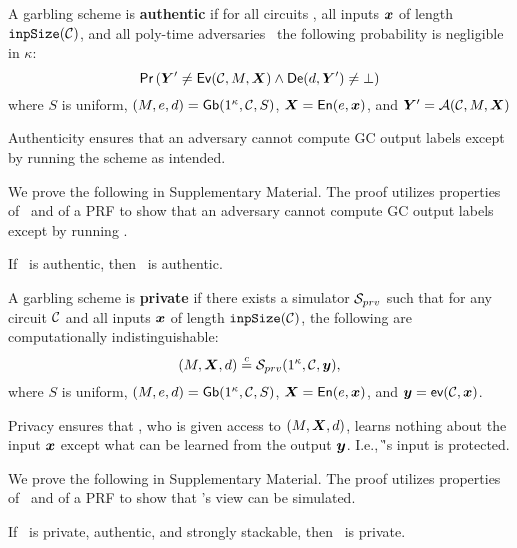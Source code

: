 \begin{definition}[Authenticity]\label{def:authenticity}
  A garbling scheme is \textbf{authentic} if for
  all circuits \cir,
  all inputs $\cirinp$ of length $\mathtt{inpSize}(\mathcal C)$,
  and all poly-time adversaries \adv\
  the following probability is negligible in $\kappa$:
  \[
    \pr{\gcirout' \neq \gEv(\cir, \mat,\gcirinp)
    \land
    \gDe(d, \gcirout') \neq \bot}
  \]
  where
  $S$ is uniform,
  $(M, e, d) = \textsf{Gb}(1^\kappa,\mathcal C,S)$,
  $\gcirinp = \gEn(e,\cirinp)$,
  and $\gcirout' = \adv(\cir, \mat, \gcirinp)$
\end{definition}

Authenticity ensures that an adversary cannot compute GC output labels
except by running the scheme as intended.

We prove the following in Supplementary Material. The proof
utilizes properties of \underscheme\ and of a PRF to show
that an adversary cannot compute GC output labels except by running
\ourschemelong.

\begin{theorem}\label{thm:authenticity}
  If \underscheme\ is authentic, then \ourschemelong\ is authentic.
\end{theorem}

\begin{definition}[Privacy]\label{def:privacy}
  A garbling scheme is \textbf{private} if
  there exists a simulator $\mathcal{S}_{prv}$ such that for
  any circuit $\mathcal C$
  and all inputs $\cirinp$ of length $\mathtt{inpSize}(\mathcal C)$,
  the following are computationally indistinguishable:
   \[
  (\mat, \gcirinp, d)
  \indist
  \simulator_{prv}(1^\kappa, \cir, \cirout),
  \]
  where
  $S$ is uniform,
   $(M, e, d) = \textsf{Gb}(1^\kappa,\mathcal C,S)$,
  $\gcirinp = \gEn(e,\cirinp)$,
  and $\cirout = \gev(\cir,\cirinp)$.
\end{definition}


Privacy ensures that \E, who is given access to
$(\mat, \gcirinp, d)$, learns nothing about the input
$\cirinp$ except what can be learned from the output
$\cirout$. I.e., \G's input is protected.

We prove the following in Supplementary Material. The proof
utilizes properties of \underscheme\ and of a PRF to show
that \E's view can be simulated.

\begin{theorem}\label{thm:privacy}
  If \underscheme\ is private, authentic, and strongly stackable, then
  \ourschemelong\ is private.
\end{theorem}
